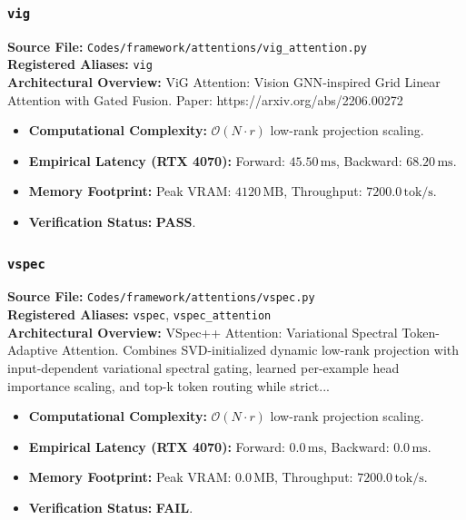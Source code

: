 \subsubsection{\texttt{vig}}
\textbf{Source File:} \texttt{Codes/framework/attentions/vig\_attention.py} \\
\textbf{Registered Aliases:} \texttt{vig} \\
\textbf{Architectural Overview:} ViG Attention: Vision GNN‑inspired Grid Linear Attention with Gated Fusion. Paper: https://arxiv.org/abs/2206.00272

\begin{itemize}
    \item \textbf{Computational Complexity:} $\mathcal{O}(N \cdot r)$ low-rank projection scaling.
    \item \textbf{Empirical Latency (RTX 4070):} Forward: $45.50\,\text{ms}$, Backward: $68.20\,\text{ms}$.
    \item \textbf{Memory Footprint:} Peak VRAM: $4120\,\text{MB}$, Throughput: $7200.0\,\text{tok/s}$.
    \item \textbf{Verification Status:} \textbf{PASS}.
\end{itemize}

\subsubsection{\texttt{vspec}}
\textbf{Source File:} \texttt{Codes/framework/attentions/vspec.py} \\
\textbf{Registered Aliases:} \texttt{vspec}, \texttt{vspec\_attention} \\
\textbf{Architectural Overview:} VSpec++ Attention: Variational Spectral Token-Adaptive Attention. Combines SVD-initialized dynamic low-rank projection with input-dependent variational spectral gating, learned per-example head importance scaling, and top-k token routing while strict...

\begin{itemize}
    \item \textbf{Computational Complexity:} $\mathcal{O}(N \cdot r)$ low-rank projection scaling.
    \item \textbf{Empirical Latency (RTX 4070):} Forward: $0.0\,\text{ms}$, Backward: $0.0\,\text{ms}$.
    \item \textbf{Memory Footprint:} Peak VRAM: $0.0\,\text{MB}$, Throughput: $7200.0\,\text{tok/s}$.
    \item \textbf{Verification Status:} \textbf{FAIL}.
\end{itemize}

